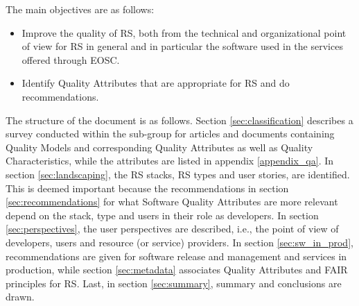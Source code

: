 The main objectives are as follows:

\begin{itemize}
    \item Improve the quality of RS, both from the technical and organizational point of view for RS in general and in particular the software used in the services offered through EOSC.
    \item Identify Quality Attributes that are appropriate for RS and do recommendations.
\end{itemize}

The structure of the document is as follows. Section \ref{sec:classification} describes a survey conducted within the sub-group for articles and documents containing Quality Models and corresponding Quality Attributes as well as Quality Characteristics, while the attributes are listed in appendix \ref{appendix_qa}. In section \ref{sec:landscaping}, the RS stacks, RS types and user stories, are identified. This is deemed important because the recommendations in section \ref{sec:recommendations} for what Software Quality Attributes are more relevant depend on the stack, type and users in their role as developers. In section \ref{sec:perspectives}, the user perspectives are described, i.e., the point of view of developers, users and resource (or service) providers. In section \ref{sec:sw_in_prod}, recommendations are given for software release and management and services in production, while section \ref{sec:metadata} associates Quality Attributes and FAIR principles for RS. Last, in section \ref{sec:summary}, summary and conclusions are drawn.
